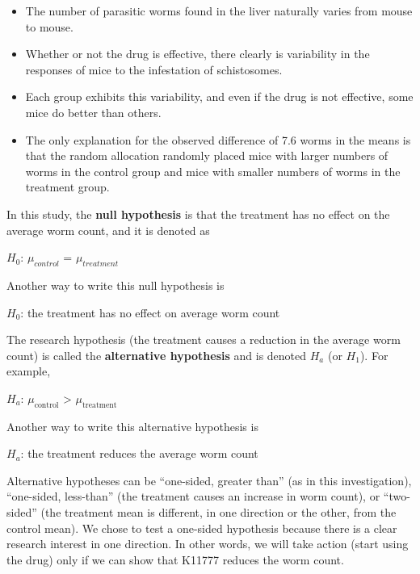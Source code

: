 \documentclass[
]{report}
\providecommand{\tightlist}{%
  \setlength{\itemsep}{0pt}\setlength{\parskip}{0pt}}
\begin{document}
\begin{itemize}
\tightlist
\item
  The number of parasitic worms found in the liver naturally varies from mouse to mouse.
\item
  Whether or not the drug is effective, there clearly is variability in the responses of mice to the infestation of schistosomes.
\item
  Each group exhibits this variability, and even if the drug is not effective, some mice do better than others.
\item
  The only explanation for the observed difference of 7.6 worms in the means is that the random
  allocation randomly placed mice with larger numbers of worms in the control group and mice with
  smaller numbers of worms in the treatment group.
\end{itemize}

In this study, the \textbf{null hypothesis} is that the treatment has no effect on the average worm count, and it is denoted as

\begin{center}
$H_0$: $\mu_{control}$ = $\mu_{treatment}$
\end{center}

Another way to write this null hypothesis is

\begin{center}
$H_0$: the treatment has no effect on average worm count
\end{center}

The research hypothesis (the treatment causes a reduction in the average worm count) is called the \textbf{alternative hypothesis} and is denoted \(\scriptstyle H_a\) (or \(\scriptstyle H_1\)). For example,

\begin{center}
$H_a$: $\mu_{\text{control}}$ > $\mu_{\text{treatment}}$
\end{center}

Another way to write this alternative hypothesis is

\begin{center}
$H_a$: the treatment reduces the average worm count
\end{center}

Alternative hypotheses can be ``one-sided, greater than'' (as in this investigation), ``one-sided, less-than'' (the treatment causes an increase in worm count), or ``two-sided'' (the treatment mean is different, in one direction or the other, from the control mean). We chose to test a one-sided hypothesis because there is a clear research interest in one direction. In other words, we will take action (start using the drug) only if we can show that K11777 reduces the worm count.
\end{document}
